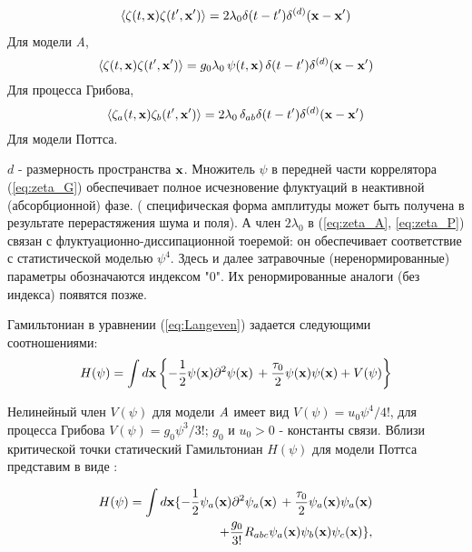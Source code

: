 \documentclass []{rusthesis} %
\begin{document}
\begin{eqnarray}
\langle \zeta (t,{\bf x})\zeta (t',{\bf x'}) \rangle =
2 \lambda_{0}  \delta(t-t')\delta^{(d)}({\bf x}-{\bf x}')
\label{eq:zeta_A}
\end{eqnarray}
Для модели {\it A},
\begin{equation}
\langle \zeta (t,{\bf x})\zeta (t',{\bf x'}) \rangle = g_{0}\lambda_{0}\,
\psi(t,{\bf x})\,   \delta(t-t')\delta^{(d)}({\bf x}-{\bf x}')
\label{eq:zeta_G}
\end{equation}
Для процесса Грибова,
\begin{equation}
\langle \zeta_a (t,{\bf x})\zeta_b (t',{\bf x'}) \rangle = 2\lambda_{0}\,
\delta_{ab} \delta(t-t')\delta^{(d)}({\bf x}-{\bf x}')
\label{eq:zeta_P}
\end{equation}
Для модели Поттса.

$d$ - размерность пространства ${\bf x}$. Множитель $\psi$ в передней части коррелятора
(\ref{eq:zeta_G}) обеспечивает полное исчезновение флуктуаций в неактивной (абсорбционной) фазе. (
{ специфическая форма амплитуды может быть получена в результате перерастяжения шума и поля}).
А член $2\lambda_0$ в (\ref{eq:zeta_A}, \ref{eq:zeta_P}) связан с флуктуационно-диссипационной тоеремой: он обеспечивает
соответствие с статистической моделью $\psi^4$. Здесь и далее затравочные (неренормированные) параметры
обозначаются индексом "0". Их ренормированные аналоги (без индекса) появятся позже.

Гамильтониан в уравнении (\ref{eq:Langeven}) задается следующими соотношениями:
\begin{equation}
H(\psi) = \int d{\bf x} \left \{ -\frac{1}{2} \psi({\bf x}) \partial^2 \psi({\bf x}) \, 
+\frac{\tau_0}{2} \psi({\bf x}) \psi({\bf x}) + V(\psi)\right \}
\label{eq:H_A_G}
\end{equation}

Нелинейный член $V(\psi)$ для модели ${\it A}$ имеет вид $V(\psi)=u_0 \psi^4/4!$, для процесса Грибова $V(\psi)=g_0 \psi^3/3!$; 
$g_0$ и $u_0 >0 $ - константы связи. Вблизи критической точки статический Гамильтониан $H(\psi)$ для модели Поттса представим в виде \cite{Golner, Zia, Priest}:

\begin{eqnarray}
H(\psi) = \int d{\bf x} \{ -\frac{1}{2} \psi_a({\bf x}) \partial^2 \psi_a({\bf x}) \, 
+\frac{\tau_0}{2} \psi_a({\bf x}) \psi_a({\bf x}) \nonumber \\
+ \frac{g_0}{3!}R_{abc} \psi_a({\bf x}) \psi_b({\bf x}) \psi_c({\bf x})  \},
\label{eq:H_P}
\end{eqnarray}
\end{document}
